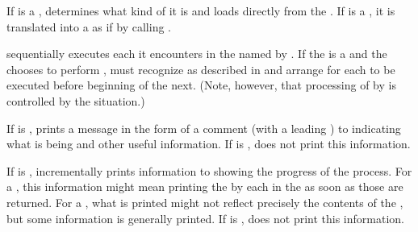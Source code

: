 If  is a ,
 determines what kind of  it is 
and loads directly from the .
If  is a ,
it is translated into a 
as if by calling .

 sequentially executes each  it encounters
in the  named by .
If the  is a 
and the  chooses to perform ,
 must recognize  
as described in {\secref\TopLevelForms}
and arrange for each  to be executed 
before beginning  of the next.
(Note, however, that processing of  
by  is controlled by the  situation.)

If  is ,
 prints a message in the form of a comment
(\ie with a leading )
to  indicating what  is being 
and other useful information.
If  is , 
 does not print this information.

If  is ,
 incrementally prints information to 
showing the progress of the  process.
For a ,
this information might mean printing the  
 by each  in the 
as soon as those  are returned.
For a , 
what is printed might not reflect precisely the contents of the ,
but some information is generally printed.
If  is ,
 does not print this information.

